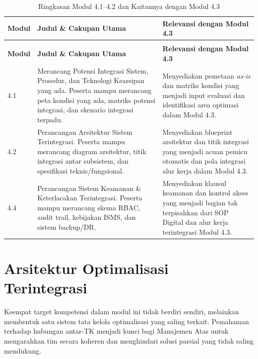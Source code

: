 \documentclass[12pt,a4paper]{report}
\begin{document}
\begingroup
\small
\begin{xltabular}{\textwidth}{@{} >{\raggedright\arraybackslash}p{1.5cm} X X @{}}
\caption{Ringkasan Modul 4.1--4.2 dan Kaitannya dengan Modul 4.3}
\label{tab:ringkasan-modul}\\
\toprule
\textbf{Modul} & \textbf{Judul \& Cakupan Utama} & \textbf{Relevansi dengan Modul 4.3} \\
\midrule
\endfirsthead

\\
\toprule
\textbf{Modul} & \textbf{Judul \& Cakupan Utama} & \textbf{Relevansi dengan Modul 4.3} \\
\midrule
\endhead

\bottomrule
\endfoot

4.1 & Merancang Potensi Integrasi Sistem, Prosedur, dan Teknologi Kearsipan yang ada. Peserta mampu merancang peta kondisi yang ada, matriks potensi integrasi, dan skenario integrasi terpadu. & Menyediakan pemetaan \textit{as-is} dan matriks kondisi yang menjadi input evaluasi dan identifikasi area optimasi dalam Modul 4.3. \\
4.2 & Perancangan Arsitektur Sistem Terintegrasi. Peserta mampu merancang diagram arsitektur, titik integrasi antar subsistem, dan spesifikasi teknis/fungsional. & Menyediakan blueprint arsitektur dan titik integrasi yang menjadi acuan pemicu otomatis dan pola integrasi alur kerja dalam Modul 4.3. \\
4.4 & Perancangan Sistem Keamanan \& Keterlacakan Terintegrasi. Peserta mampu merancang skema RBAC, audit trail, kebijakan ISMS, dan sistem backup/DR. & Menyediakan klausul keamanan dan kontrol akses yang menjadi bagian tak terpisahkan dari SOP Digital dan alur kerja terintegrasi Modul 4.3. \\
\end{xltabular}
\endgroup


\section{Arsitektur Optimalisasi Terintegrasi}
Keempat target kompetensi dalam modul ini tidak berdiri sendiri, melainkan membentuk satu sistem tata kelola optimalisasi yang saling terkait. Pemahaman terhadap hubungan antar-TK menjadi kunci bagi Manajemen Atas untuk mengarahkan tim secara koheren dan menghindari solusi parsial yang tidak saling mendukung.
\end{document}
